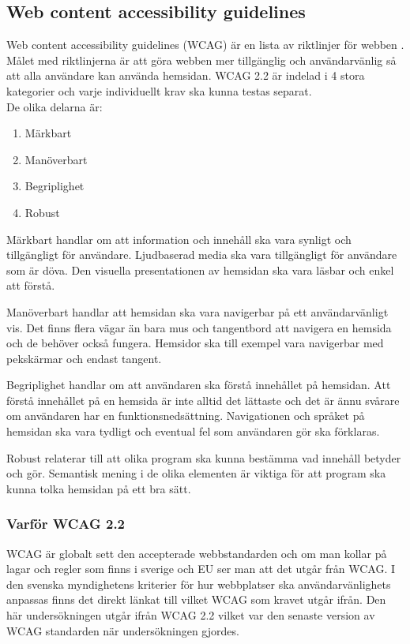 \documentclass[11p]{article}
\begin{document}
    \subsection{Web content accessibility guidelines}
    Web content accessibility guidelines (WCAG) är en lista av riktlinjer för webben \parencite{WCAG_2.2}.
    Målet med riktlinjerna är att göra webben mer tillgänglig och användarvänlig så att alla användare kan använda hemsidan.
    WCAG 2.2 är indelad i 4 stora kategorier och varje individuellt krav ska kunna testas separat.
    \\De olika delarna är:
    \begin{enumerate}
        \item Märkbart
        \item Manöverbart
        \item Begriplighet
        \item Robust
    \end{enumerate}

    Märkbart handlar om att information och innehåll ska vara synligt och tillgängligt för användare.
    Ljudbaserad media ska vara tillgängligt för användare som är döva.
    Den visuella presentationen av hemsidan ska vara läsbar och enkel att förstå.

    Manöverbart handlar att hemsidan ska vara navigerbar på ett användarvänligt vis.
    Det finns flera vägar än bara mus och tangentbord att navigera en hemsida och de behöver också fungera.
    Hemsidor ska till exempel vara navigerbar med pekskärmar och endast tangent.

    Begriplighet handlar om att användaren ska förstå innehållet på hemsidan.
    Att förstå innehållet på en hemsida är inte alltid det lättaste och det är ännu svårare om användaren har en funktionsnedsättning.
    Navigationen och språket på hemsidan ska vara tydligt och eventual fel som användaren gör ska förklaras.

    Robust relaterar till att olika program ska kunna bestämma vad innehåll betyder och gör.
    Semantisk mening i de olika elementen är viktiga för att program ska kunna tolka hemsidan på ett bra sätt.

    \subsubsection{Varför WCAG 2.2}
    WCAG är globalt sett den accepterade webbstandarden och om man kollar på lagar och regler som finns i sverige och EU ser man att det utgår från WCAG.
    I den svenska myndighetens kriterier för hur webbplatser ska användarvänlighets anpassas finns det direkt länkat till vilket WCAG som kravet utgår ifrån. \parencite{Utförande_av_Dos_lagen}
    Den här undersökningen utgår ifrån WCAG 2.2 vilket var den senaste version av WCAG standarden när undersökningen gjordes.
\end{document}
